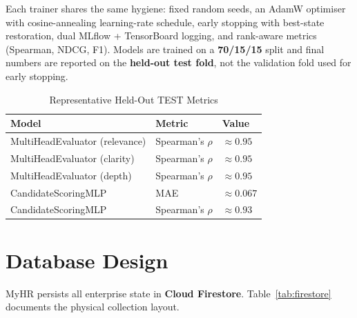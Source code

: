 \documentclass[12pt,a4paper,oneside]{report}
\begin{document}
Each trainer shares the same hygiene: fixed random seeds, an AdamW optimiser with
cosine-annealing learning-rate schedule, early stopping with best-state restoration, dual
MLflow + TensorBoard logging, and rank-aware metrics (Spearman, NDCG, F1). Models are trained
on a \textbf{70/15/15} split and final numbers are reported on the \textbf{held-out test fold},
not the validation fold used for early stopping.

\begin{table}[H]
\centering
\caption{Representative Held-Out TEST Metrics}
\label{tab:trainmetrics}
\begin{tabularx}{\textwidth}{L{5cm}L{3.5cm}C{3cm}}
\toprule
\textbf{Model} & \textbf{Metric} & \textbf{Value} \\
\midrule
MultiHeadEvaluator (relevance) & Spearman's $\rho$ & $\approx 0.95$ \\
MultiHeadEvaluator (clarity)   & Spearman's $\rho$ & $\approx 0.95$ \\
MultiHeadEvaluator (depth)     & Spearman's $\rho$ & $\approx 0.95$ \\
CandidateScoringMLP            & MAE                & $\approx 0.067$ \\
CandidateScoringMLP            & Spearman's $\rho$ & $\approx 0.93$ \\
\bottomrule
\end{tabularx}
\end{table}

\section{Database Design}
\label{sec:database}

MyHR persists all enterprise state in \textbf{Cloud Firestore}. Table~\ref{tab:firestore}
documents the physical collection layout.
\end{document}
